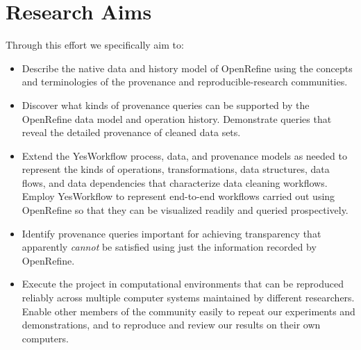 \section{Research Aims}

Through this effort we specifically aim to:

\begin{itemize}[label=\raisebox{0.25ex}{\tiny$\bullet$}]

\item Describe the native data and history model of OpenRefine using the concepts and terminologies of the provenance and reproducible-research communities.

\item Discover what kinds of provenance queries can be supported by the OpenRefine data model and operation history.  Demonstrate queries that reveal the detailed provenance of cleaned data sets.

\item Extend the YesWorkflow process, data, and provenance models as needed to represent the kinds of operations, transformations, data structures, data flows, and data dependencies that characterize data cleaning workflows.  Employ YesWorkflow to represent end-to-end workflows carried out using OpenRefine so that they can be visualized readily and queried prospectively.

\item Identify provenance queries important for achieving transparency that apparently \emph{cannot} be satisfied using just the information recorded by OpenRefine.

\item Execute the project in computational environments that can be reproduced reliably across multiple computer systems maintained by different researchers.  Enable other members of the community easily to repeat our experiments and demonstrations, and to reproduce and review our results on their own computers.

\end{itemize}
